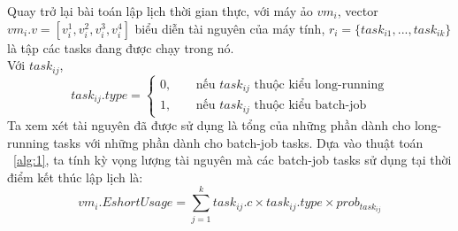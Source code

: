 \documentclass{my_style}
\begin{document}
\noindent
Quay trở lại bài toán lập lịch thời gian thực, với máy ảo $vm_{i}$, vector $vm_{i}.v = [v_{i}^{1}, v_{i}^{2}, v_{i}^{3}, v_{i}^{4}]$ biểu diễn tài nguyên của máy tính, $r_{i} = \{task_{i1}, ..., task_{ik}\}$ là tập các tasks đang được chạy trong nó.\\
Với $task_{ij}$, 
\[
task_{ij}.type = 
	\begin{cases}
		\text{0, } &\quad\text{nếu $task_{ij}$ thuộc kiểu long-running} \\
		\text{1, } &\quad\text{nếu $task_{ij}$ thuộc kiểu batch-job}
	\end{cases}
\]
Ta xem xét tài nguyên đã được sử dụng là tổng của những phần dành cho long-running tasks với những phần dành cho batch-job tasks. Dựa vào thuật toán ~\ref{alg:1}, ta tính kỳ vọng lượng tài nguyên mà các batch-job tasks sử dụng tại thời điểm kết thúc lập lịch là: 
\[
	vm_{i}.EshortUsage = \sum_{j=1}^{k}task_{ij}.c \times task_{ij}.type \times prob_{task_{ij}}
\]
\end{document}
